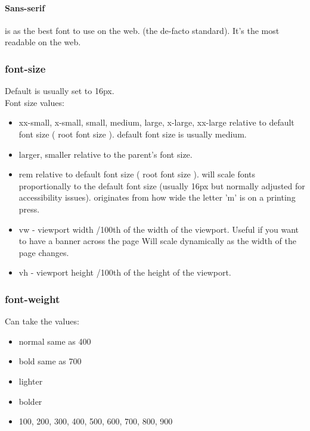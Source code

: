 \documentclass[]{article}
\newcommand{\<}{\guilsinglleft}
\renewcommand{\>}{\guilsinglright}
\begin{document}
\paragraph{Sans-serif} is as the best font to use on the web. (the de-facto standard).  It's the most readable on the web.

\subsubsection{font-size}
Default is usually set to 16px.
\\
Font size values:
\begin{itemize}
	\item xx-small, x-small, small, medium, large, x-large, xx-large
	\subitem relative to default font size ( root font size ).
	\subitem default font size is usually medium.
	
	\item larger, smaller 
	\subitem relative to the parent's font size.
	
	\item rem 
	\subitem relative to default font size ( root font size ).
	\subitem will scale fonts proportionally to the default font size (usually 16px but normally adjusted for accessibility issues).
	\subitem originates from how wide the letter 'm' is on a printing press.
	
	\item vw - viewport width 
	/100th of the width of the viewport.
	\subitem Useful if you want to have a banner across the page 
	\subitem Will scale dynamically as the width of the page changes.
	
	\item vh - viewport height
	/100th of the height of the viewport.
\end{itemize}

\subsubsection{font-weight}
Can take the values:
\begin{itemize}
	\item normal
	\subitem same as 400
	
	\item bold
	\subitem same as 700
	
	\item lighter
	\item bolder
	\item 100, 200, 300, 400, 500, 600, 700, 800, 900
\end{itemize}
\end{document}
